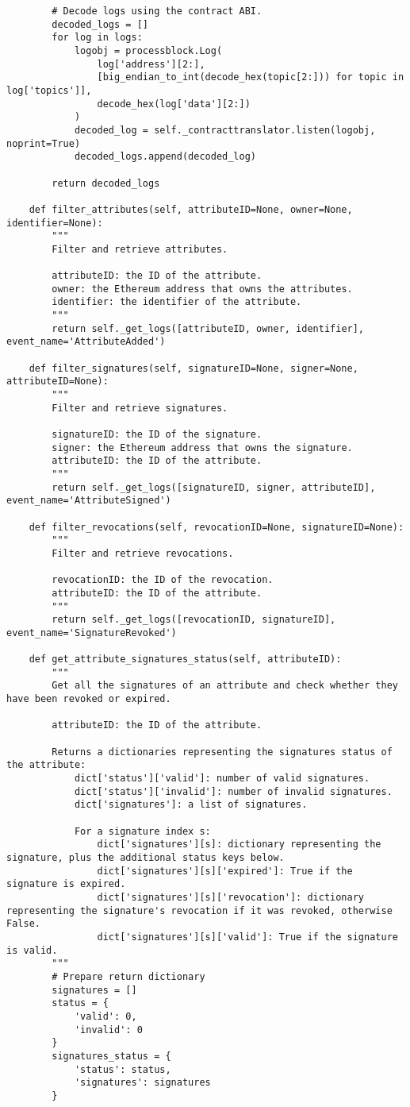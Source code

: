 \documentclass[12pt]{report}
\begin{document}
\begin{lstlisting}
        # Decode logs using the contract ABI.
        decoded_logs = []
        for log in logs:
            logobj = processblock.Log(
                log['address'][2:],
                [big_endian_to_int(decode_hex(topic[2:])) for topic in log['topics']],
                decode_hex(log['data'][2:])
            )
            decoded_log = self._contracttranslator.listen(logobj, noprint=True)
            decoded_logs.append(decoded_log)

        return decoded_logs

    def filter_attributes(self, attributeID=None, owner=None, identifier=None):
        """
        Filter and retrieve attributes.

        attributeID: the ID of the attribute.
        owner: the Ethereum address that owns the attributes.
        identifier: the identifier of the attribute.
        """
        return self._get_logs([attributeID, owner, identifier], event_name='AttributeAdded')

    def filter_signatures(self, signatureID=None, signer=None, attributeID=None):
        """
        Filter and retrieve signatures.

        signatureID: the ID of the signature.
        signer: the Ethereum address that owns the signature.
        attributeID: the ID of the attribute.
        """
        return self._get_logs([signatureID, signer, attributeID], event_name='AttributeSigned')

    def filter_revocations(self, revocationID=None, signatureID=None):
        """
        Filter and retrieve revocations.

        revocationID: the ID of the revocation.
        attributeID: the ID of the attribute.
        """
        return self._get_logs([revocationID, signatureID], event_name='SignatureRevoked')

    def get_attribute_signatures_status(self, attributeID):
        """
        Get all the signatures of an attribute and check whether they have been revoked or expired.

        attributeID: the ID of the attribute.

        Returns a dictionaries representing the signatures status of the attribute:
            dict['status']['valid']: number of valid signatures.
            dict['status']['invalid']: number of invalid signatures.
            dict['signatures']: a list of signatures.

            For a signature index s:
                dict['signatures'][s]: dictionary representing the signature, plus the additional status keys below.
                dict['signatures'][s]['expired']: True if the signature is expired.
                dict['signatures'][s]['revocation']: dictionary representing the signature's revocation if it was revoked, otherwise False.
                dict['signatures'][s]['valid']: True if the signature is valid.
        """
        # Prepare return dictionary
        signatures = []
        status = {
            'valid': 0,
            'invalid': 0
        }
        signatures_status = {
            'status': status,
            'signatures': signatures
        }


\end{lstlisting}
\end{document}
